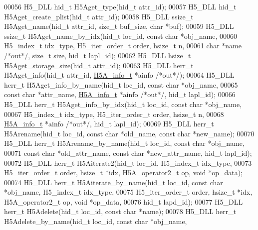 \begin{DoxyCode}
00056 H5\_DLL hid\_t   H5Aget\_type(hid\_t attr\_id);
00057 H5\_DLL hid\_t   H5Aget\_create\_plist(hid\_t attr\_id);
00058 H5\_DLL ssize\_t H5Aget\_name(hid\_t attr\_id, \textcolor{keywordtype}{size\_t} buf\_size, \textcolor{keywordtype}{char} *buf);
00059 H5\_DLL ssize\_t H5Aget\_name\_by\_idx(hid\_t loc\_id, \textcolor{keyword}{const} \textcolor{keywordtype}{char} *obj\_name,
00060     H5\_index\_t idx\_type, H5\_iter\_order\_t order, hsize\_t n,
00061     \textcolor{keywordtype}{char} *name \textcolor{comment}{/*out*/}, \textcolor{keywordtype}{size\_t} size, hid\_t lapl\_id);
00062 H5\_DLL hsize\_t H5Aget\_storage\_size(hid\_t attr\_id);
00063 H5\_DLL herr\_t  H5Aget\_info(hid\_t attr\_id, \hyperlink{struct_h5_a__info__t}{H5A\_info\_t} *ainfo \textcolor{comment}{/*out*/});
00064 H5\_DLL herr\_t  H5Aget\_info\_by\_name(hid\_t loc\_id, \textcolor{keyword}{const} \textcolor{keywordtype}{char} *obj\_name,
00065     \textcolor{keyword}{const} \textcolor{keywordtype}{char} *attr\_name, \hyperlink{struct_h5_a__info__t}{H5A\_info\_t} *ainfo \textcolor{comment}{/*out*/}, hid\_t lapl\_id);
00066 H5\_DLL herr\_t  H5Aget\_info\_by\_idx(hid\_t loc\_id, \textcolor{keyword}{const} \textcolor{keywordtype}{char} *obj\_name,
00067     H5\_index\_t idx\_type, H5\_iter\_order\_t order, hsize\_t n,
00068     \hyperlink{struct_h5_a__info__t}{H5A\_info\_t} *ainfo \textcolor{comment}{/*out*/}, hid\_t lapl\_id);
00069 H5\_DLL herr\_t  H5Arename(hid\_t loc\_id, \textcolor{keyword}{const} \textcolor{keywordtype}{char} *old\_name, \textcolor{keyword}{const} \textcolor{keywordtype}{char} *new\_name);
00070 H5\_DLL herr\_t  H5Arename\_by\_name(hid\_t loc\_id, \textcolor{keyword}{const} \textcolor{keywordtype}{char} *obj\_name,
00071     \textcolor{keyword}{const} \textcolor{keywordtype}{char} *old\_attr\_name, \textcolor{keyword}{const} \textcolor{keywordtype}{char} *new\_attr\_name, hid\_t lapl\_id);
00072 H5\_DLL herr\_t  H5Aiterate2(hid\_t loc\_id, H5\_index\_t idx\_type,
00073     H5\_iter\_order\_t order, hsize\_t *idx, H5A\_operator2\_t op, \textcolor{keywordtype}{void} *op\_data);
00074 H5\_DLL herr\_t  H5Aiterate\_by\_name(hid\_t loc\_id, \textcolor{keyword}{const} \textcolor{keywordtype}{char} *obj\_name, H5\_index\_t idx\_type,
00075     H5\_iter\_order\_t order, hsize\_t *idx, H5A\_operator2\_t op, \textcolor{keywordtype}{void} *op\_data,
00076     hid\_t lapd\_id);
00077 H5\_DLL herr\_t  H5Adelete(hid\_t loc\_id, \textcolor{keyword}{const} \textcolor{keywordtype}{char} *name);
00078 H5\_DLL herr\_t  H5Adelete\_by\_name(hid\_t loc\_id, \textcolor{keyword}{const} \textcolor{keywordtype}{char} *obj\_name,

\end{DoxyCode}

